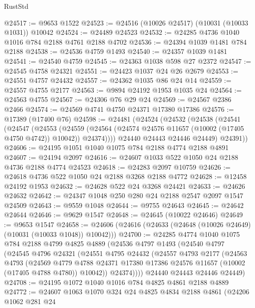 \begin{lexlean}{RustStd}
\begin{coremodule}
@24517 := @9653 @1522
@24523 := @24516 (@10026 @24517) (@10031 (@10033 @1031)) @10042
@24524 := @24489 @24523
@24532 := @24285 @4736 @1040 @1016 @784 @2188 @4761 @2188 @4702
@24536 := @24394 @1039 @1481 @784 @2188
@24538 := @24536 @4759 @1493
@24540 := @24357 @1039 @1481
@24541 := @24540 @4759
@24545 := @24363 @1038 @598 @27 @2372
@24547 := @24545 @4758 @24321
@24551 := @24423 @1037 @24 @26 @2679
@24553 := @24551 @4757 @24432
@24557 := @24362 @1035 @86 @24 @14
@24559 := @24557 @4755 @2177
@24563 := @9894 @24192 @1953 @1035 @24
@24564 := @24563 @4755
@24567 := @24306 @76 @29 @24
@24569 := @24567 @2386 @2466
@24574 := @24569 @4741 @4750 @24371 @17380 @17386
@24576 := @17389 (@17400 @76)
@24598 := @24481
    (@24524
      (@24532
        (@24538
          (@24541
            (@24547
              (@24553
                (@24559
                  (@24564 (@24574 @24576 @11657 (@10002 (@17405 @4750 @4742)) @10042))
                  @24374))))
          @24440
          @24443
          @24446
          @24449)
        @24391))
@24606 := @24195 @1051 @1040 @1075 @784 @2188 @4774 @2188 @4891
@24607 := @24194 @2097
@24616 := @24607 @1033 @522 @1050 @24 @2188 @4736 @2188 @4774 @24523
@24618 := @24283 @2097 @10759
@24626 := @24618 @4736 @522 @1050 @24 @2188 @3268 @2188 @4772
@24628 := @12458 @24192 @1953
@24632 := @24628 @522 @24 @3268 @24421
@24633 := @24626 @24632
@24642 := @24347 @1048 @250 @280 @24 @2188 @2547 @2097 @1547 @24509
@24643 := @9559 @1048
@24644 := @9755 @24643
@24645 := @24642 @24644
@24646 := @9629 @1547
@24648 := @24645 (@10022 @24646)
@24649 := @9653 @1547
@24658 := @24606 (@24616 (@24633 (@24648 (@10026 @24649) (@10031 (@10033 @1048)) @10042)))
@24700 := @24285
    @4774
    @1040
    @1075
    @784
    @2188
    @4799
    @4825
    @4889
    (@24536
      @4797
      @1493
      (@24540
        @4797
        (@24545
          @4796
          @24321
          (@24551
            @4795
            @24432
            (@24557
              @4793
              @2177
              (@24563
                @4793
                (@24569
                  @4779
                  @4788
                  @24371
                  @17380
                  @17386
                  @24576
                  @11657
                  (@10002 (@17405 @4788 @4780))
                  @10042))
              @24374))))
      @24440
      @24443
      @24446
      @24449)
@24708 := @24195 @1072 @1040 @1016 @784 @4825 @4861 @2188 @4889
@24772 := @24607
    @1063
    @1070
    @324
    @24
    @4825
    @4834
    @2188
    @4861
    (@24206
      @1062
      @281
      @24

\end{coremodule}
\end{lexlean}
